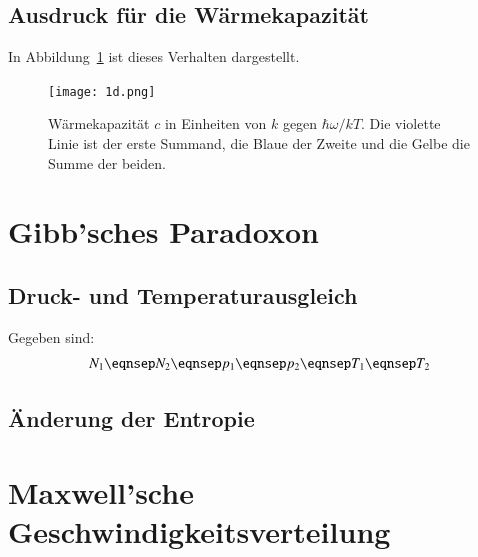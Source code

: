 \subsection{Ausdruck für die Wärmekapazität}

In Abbildung~\ref{fig:1d-c} ist dieses Verhalten dargestellt.

\begin{figure}[htbp]
    \centering
    \texttt{[image: 1d.png]}
    \caption{%
        Wärmekapazität $c$ in Einheiten von $k$ gegen $\hbar\omega / kT$. Die
        violette Linie ist der erste Summand, die Blaue der Zweite und die
        Gelbe die Summe der beiden.
    }
    \label{fig:1d-c}
\end{figure}

\section{Gibb'sches Paradoxon}

\subsection{Druck- und Temperaturausgleich}

Gegeben sind:
\[
    N_1
    \eqnsep
    N_2
    \eqnsep
    p_1
    \eqnsep
    p_2
    \eqnsep
    T_1
    \eqnsep
    T_2
\]

\subsection{Änderung der Entropie}

\section{Maxwell'sche Geschwindigkeitsverteilung}


\IfFileExists{\bibliographyfile}{
    \printbibliography
}{}



